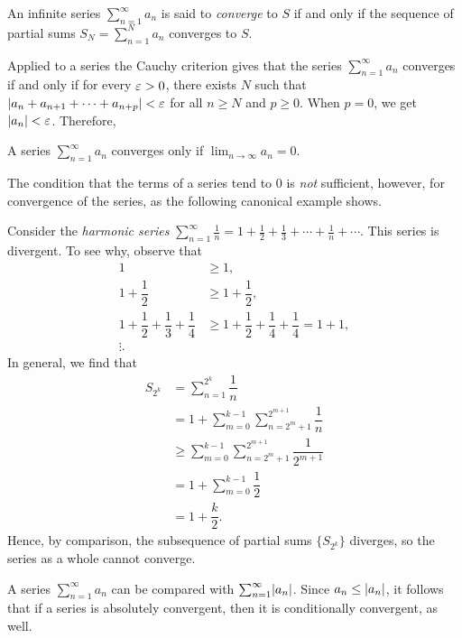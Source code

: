 \begin{definition}
	An infinite series $\sum_{n=1}^{\infty}a_n$ is said to \textit{converge} to $S$ if and only if the sequence of partial sums $S_N=\sum_{n=1}^{N}a_n$ converges to $S$.
\end{definition}

Applied to a series the Cauchy criterion gives that the series $\sum_{n=1}^{\infty} a_n$ converges if and only if for every $\varepsilon>0$, there exists $N$ such that $\lvert a_n+a_{n+1}+\cdots+a_{n+p} \rvert<\varepsilon$ for all $n \ge N$ and $p \ge 0$. When $p=0$, we get $\lvert a_n \rvert<\varepsilon$. Therefore,
\begin{proposition}
	A series $\sum_{n=1}^{\infty}a_n$ converges only if $\lim_{n \rightarrow \infty}a_n=0$.
\end{proposition}

The condition that the terms of a series tend to $0$ is \textit{not} sufficient, however, for convergence of the series, as the following canonical example shows.

\begin{example}
	Consider the \emph{harmonic series} $\sum_{n=1}^{\infty} \frac{1}{n}=1+\frac{1}{2}+\frac{1}{3}+\cdots+\frac{1}{n}+\cdots$. This series is divergent. To see why, observe that
	\begin{align*}
		1 &\ge 1, \\
		1+\dfrac{1}{2} &\ge 1+\dfrac{1}{2}, \\
		1+\dfrac{1}{2}+\dfrac{1}{3}+\dfrac{1}{4} &\ge 1+\dfrac{1}{2}+\dfrac{1}{4}+\dfrac{1}{4}=1+1, \\
		\vdots.
	\end{align*}
	In general, we find that 
	\begin{align*}
	S_{2^k} &=\sum_{n=1}^{2^k}\dfrac{1}{n} \\
	&=1+\sum_{m=0}^{k-1}\sum_{n=2^m+1}^{2^{m+1}}\dfrac{1}{n} \\
	&\ge \sum_{m=0}^{k-1}\sum_{n=2^m+1}^{2^{m+1}}\dfrac{1}{2^{m+1}} \\
	&=1+\sum_{m=0}^{k-1} \dfrac{1}{2} \\
	&=1+\dfrac{k}{2}.
	\end{align*}
	Hence, by comparison, the subsequence of partial sums $\{S_{2^k}\}$ diverges, so the series as a whole cannot converge.
\end{example}

A series $\sum_{n=1}^{\infty}a_n$ can be compared with $\sum_{n=1}^{\infty}\lvert a_n \rvert$. Since $a_n \le \lvert a_n \rvert$, it follows that if a series is absolutely convergent, then it is conditionally convergent, as well.

